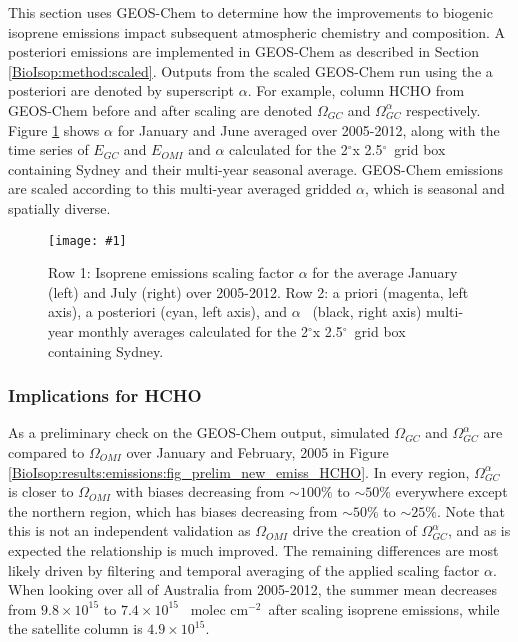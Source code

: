 \documentclass[acp, manuscript]{copernicus}
\newcommand{\Oomi}{\Omega_{OMI}} %
\newcommand{\Ogc}{\Omega_{GC}}  %
\newcommand{\Ogca}{\Omega_{GC}^{\alpha}} %
\newcommand{\apri}{E_{GC}} %
\newcommand{\apost}{E_{OMI}} %
\newcommand{\degr}{$^{\circ}$}
\newcommand{\moleccm}{~molec cm$^{-2}$}
\newcommand{\mypic}[3]{%
  \begin{figure}
    \texttt{[image: \#1]}
    \caption{#2}
    #3
  \end{figure}
}
\begin{document}
    This section uses GEOS-Chem to determine how the improvements to biogenic isoprene emissions impact subsequent atmospheric chemistry and composition.
    A posteriori emissions are implemented in GEOS-Chem as described in Section \ref{BioIsop:method:scaled}.
    Outputs from the scaled GEOS-Chem run using the a posteriori are denoted by superscript $\alpha$.
    For example, column HCHO from GEOS-Chem before and after scaling are denoted $\Ogc$ and $\Ogca$ respectively.
    Figure \ref{BioIsop:results:new_emiss:fig_alpha_mya} shows $\alpha$ for January and June averaged over 2005-2012, along with the time series of $\apri$ and $\apost$ and $\alpha$ calculated for the 2\degr x 2.5\degr ~grid box containing Sydney and their multi-year seasonal average.
    GEOS-Chem emissions are scaled according to this multi-year averaged gridded $\alpha$, which is seasonal and spatially diverse.
    
    \mypic{Figures/new_emiss/alpha_mya.png}{%
      Row 1: Isoprene emissions scaling factor $\alpha$ for the average January (left) and July (right) over 2005-2012.
      Row 2: a priori (magenta, left axis), a posteriori (cyan, left axis), and  $\alpha$ ~(black, right axis) multi-year monthly averages calculated for the 2\degr x 2.5\degr ~grid box containing Sydney.
    }{\label{BioIsop:results:new_emiss:fig_alpha_mya}}
    
    
    \subsubsection{Implications for HCHO}
  
      As a preliminary check on the GEOS-Chem output, simulated $\Ogc$ and $\Ogca$ are compared to $\Oomi$ over January and February, 2005 in Figure \ref{BioIsop:results:emissions:fig_prelim_new_emiss_HCHO}.
      In every region, $\Ogca$ is closer to $\Oomi$ with biases decreasing from $\sim{100\%}$ to $\sim{50\%}$ everywhere except the northern region, which has biases decreasing from $\sim{50\%}$ to $\sim{25\%}$.
      Note that this is not an independent validation as $\Oomi$ drive the creation of $\Ogca$, and as is expected the relationship is much improved.
      The remaining differences are most likely driven by filtering and temporal averaging of the applied scaling factor $\alpha$.
      When looking over all of Australia from 2005-2012, the summer mean decreases from $ 9.8 \times 10^{15}$ to $ 7.4 \times 10^{15}$ \moleccm ~after scaling isoprene emissions, while the satellite column is $ 4.9 \times 10^{15}$.
      
\end{document}
